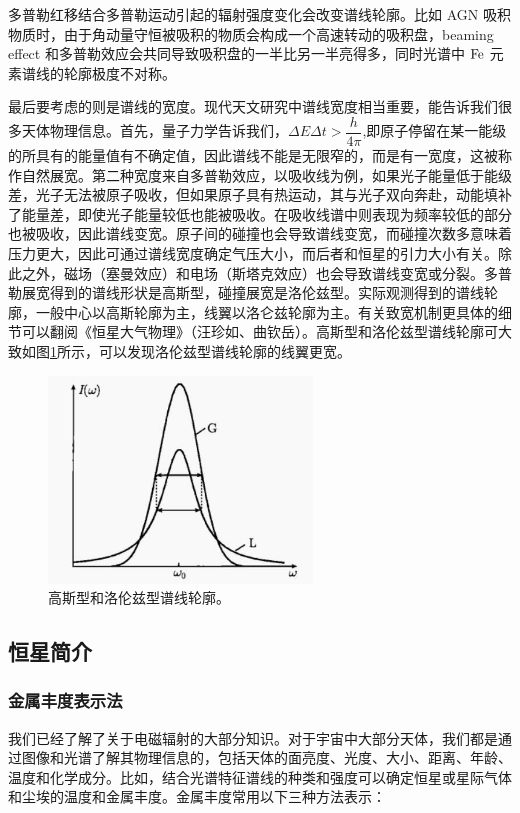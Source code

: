 \documentclass[../天体物理基础.tex]{subfiles}
\begin{document}
多普勒红移结合多普勒运动引起的辐射强度变化会改变谱线轮廓。比如 AGN 吸积物质时，由于角动量守恒被吸积的物质会构成一个高速转动的吸积盘，beaming effect 和多普勒效应会共同导致吸积盘的一半比另一半亮得多，同时光谱中 $\ce{Fe}$ 元素谱线的轮廓极度不对称。

最后要考虑的则是谱线的宽度。现代天文研究中谱线宽度相当重要，能告诉我们很多天体物理信息。首先，量子力学告诉我们，$\Delta{}E\Delta{}t>\dfrac{h}{4\pi}$,即原子停留在某一能级的所具有的能量值有不确定值，因此谱线不能是无限窄的，而是有一宽度，这被称作自然展宽。第二种宽度来自多普勒效应，以吸收线为例，如果光子能量低于能级差，光子无法被原子吸收，但如果原子具有热运动，其与光子双向奔赴，动能填补了能量差，即使光子能量较低也能被吸收。在吸收线谱中则表现为频率较低的部分也被吸收，因此谱线变宽。原子间的碰撞也会导致谱线变宽，而碰撞次数多意味着压力更大，因此可通过谱线宽度确定气压大小，而后者和恒星的引力大小有关。除此之外，磁场（塞曼效应）和电场（斯塔克效应）也会导致谱线变宽或分裂。多普勒展宽得到的谱线形状是高斯型，碰撞展宽是洛伦兹型。实际观测得到的谱线轮廓，一般中心以高斯轮廓为主，线翼以洛仑兹轮廓为主。有关致宽机制更具体的细节可以翻阅《恒星大气物理》（汪珍如、曲钦岳）。高斯型和洛伦兹型谱线轮廓可大致如图\ref{高斯型和洛伦兹型谱线轮廓。}所示，可以发现洛伦兹型谱线轮廓的线翼更宽。
\begin{figure}[!htbp]
\centering
\includegraphics[width=7cm]{figures/figure1_16.jpg}
\captionsetup{justification=raggedright, singlelinecheck=false}
\caption{高斯型和洛伦兹型谱线轮廓。}
\label{高斯型和洛伦兹型谱线轮廓。}
\end{figure}

\subsection{恒星简介}
\subsubsection{金属丰度表示法}
我们已经了解了关于电磁辐射的大部分知识。对于宇宙中大部分天体，我们都是通过图像和光谱了解其物理信息的，包括天体的面亮度、光度、大小、距离、年龄、温度和化学成分。比如，结合光谱特征谱线的种类和强度可以确定恒星或星际气体和尘埃的温度和金属丰度。金属丰度常用以下三种方法表示：
\end{document}
